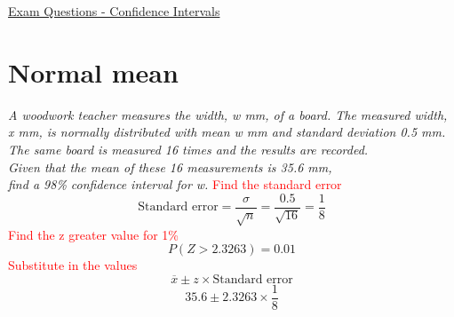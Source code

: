 \documentclass{article}[18pt]
\begin{document}
\begin{center}
\underline{\huge Exam Questions - Confidence Intervals}
\end{center}
\section{Normal mean}
\textit{A woodwork teacher measures the width, w mm, of a board. The measured width, x mm, is
normally distributed with mean w mm and standard deviation 0.5 mm.\\
The same board is measured 16 times and the results are recorded.\\
Given that the mean of these 16 measurements is 35.6 mm,\\
find a 98\% confidence interval for w.}
\textcolor{red}{Find the standard error}
$$\textrm{Standard error}=\frac{\sigma}{\sqrt{n}}=\frac{0.5}{\sqrt{16}}=\frac{1}{8}$$
\textcolor{red}{Find the z greater value for 1\%}
$$P(Z>2.3263)=0.01$$
\textcolor{red}{Substitute in the values}
$$\overline{x}\pm z\times\textrm{Standard error}$$
$$35.6\pm2.3263\times\frac{1}{8}$$
\end{document}
